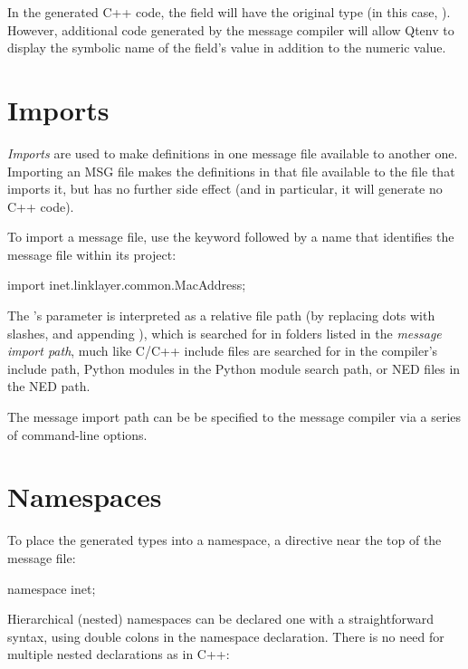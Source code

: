 In the generated C++ code, the field will have the original type (in this case,
). However, additional code generated by the message compiler
will allow Qtenv to display the symbolic name of the field's value in addition
to the numeric value.


\section{Imports}
\label{sec:msg-defs:imports}

\textit{Imports} are used to make definitions in one message file available to
another one. Importing an MSG file makes the definitions in that file available
to the file that imports it, but has no further side effect (and in particular,
it will generate no C++ code).

To import a message file, use the  keyword followed by a name
that identifies the message file within its project:

\begin{msg}
import inet.linklayer.common.MacAddress;
\end{msg}

The 's parameter is interpreted as a relative file path (by
replacing dots with slashes, and appending ), which is searched for in
folders listed in the \textit{message import path}, much like C/C++ include
files are searched for in the compiler's include path, Python modules in the
Python module search path, or NED files in the NED path.

The message import path can be be specified to the message compiler via a series
of  command-line options.


\section{Namespaces}
\label{sec:msg-defs:namespaces}
\label{sec:msg-defs:declaring-a-namespace} %

To place the generated types into a namespace, a  directive
near the top of the message file:

\begin{msg}
namespace inet;
\end{msg}

Hierarchical (nested) namespaces can be declared one with a straightforward
syntax, using double colons in the namespace declaration. There is no need for
multiple nested  declarations as in C++:

